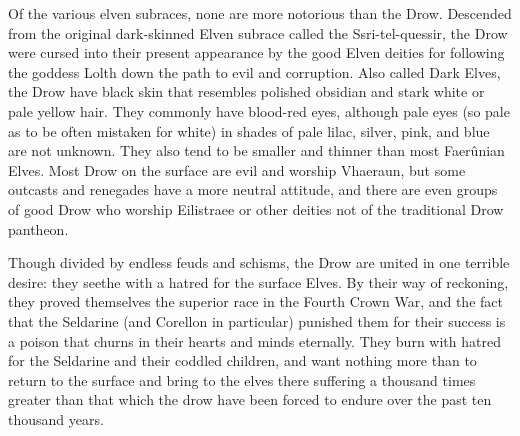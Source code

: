 
Of the various elven subraces, none are more notorious than the Drow. Descended from the original dark-skinned Elven subrace called the Ssri-tel-quessir, the Drow were cursed into their present appearance by the good Elven deities for following the goddess Lolth down the path to evil and corruption. Also called Dark Elves, the Drow have black skin that resembles polished obsidian and stark white or pale yellow hair. They commonly have blood-red eyes, although pale eyes (so pale as to be often mistaken for white) in shades of pale lilac, silver, pink, and blue are not unknown. They also tend to be smaller and thinner than most Faerûnian Elves. Most Drow on the surface are evil and worship Vhaeraun, but some outcasts and renegades have a more neutral attitude, and there are even groups of good Drow who worship Eilistraee or other deities not of the traditional Drow pantheon.

Though divided by endless feuds and schisms, the Drow are united in one terrible desire: they seethe with a hatred for the surface Elves. By their way of reckoning, they proved themselves the superior race in the Fourth Crown War, and the fact that the Seldarine (and Corellon in particular) punished them for their success is a poison that churns in their hearts and minds eternally. They burn with hatred for the Seldarine and their coddled children, and want nothing more than to return to the surface and bring to the elves there suffering a thousand times greater than that which the drow have been forced to endure over the past ten thousand years.


